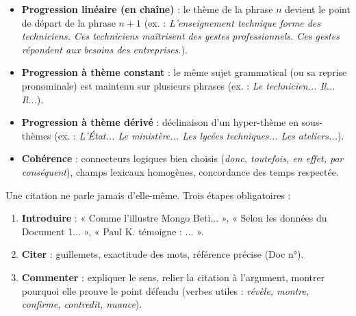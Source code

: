 \documentclass[11pt]{article}
\begin{document}
\begin{propriete}
\begin{itemize}
    \item \textbf{Progression linéaire (en chaîne)} : le thème de la phrase $n$ devient le point de départ de la phrase $n+1$ (ex. : \emph{L'enseignement technique forme des techniciens. Ces techniciens maîtrisent des gestes professionnels. Ces gestes répondent aux besoins des entreprises.}).
    \item \textbf{Progression à thème constant} : le même sujet grammatical (ou sa reprise pronominale) est maintenu sur plusieurs phrases (ex. : \emph{Le technicien... Il... Il...}).
    \item \textbf{Progression à thème dérivé} : déclinaison d'un hyper-thème en sous-thèmes (ex. : \emph{L'État... Le ministère... Les lycées techniques... Les ateliers...}).
    \item \textbf{Cohérence} : connecteurs logiques bien choisis (\emph{donc, toutefois, en effet, par conséquent}), champs lexicaux homogènes, concordance des temps respectée.
\end{itemize}
\end{propriete}

\begin{aretenir}
Une citation ne parle jamais d'elle-même. Trois étapes obligatoires :
\begin{enumerate}
    \item \textbf{Introduire} : « Comme l'illustre Mongo Beti... », « Selon les données du Document 1... », « Paul K. témoigne : ... ».
    \item \textbf{Citer} : guillemets, exactitude des mots, référence précise (Doc n°).
    \item \textbf{Commenter} : expliquer le sens, relier la citation à l'argument, montrer pourquoi elle prouve le point défendu (verbes utiles : \emph{révèle, montre, confirme, contredit, nuance}).
\end{enumerate}
\end{aretenir}
\end{document}
